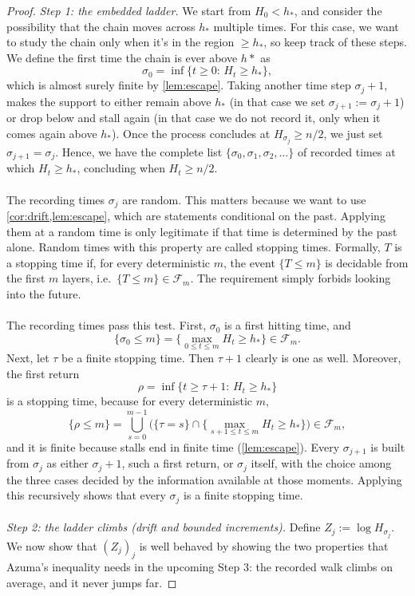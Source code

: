 \documentclass[
    aps,
    superscriptaddress,
    onecolumn,
    10pt,
    prx,
    nofootinbib
]{revtex4-2}
\theoremstyle{namedstatement}
\theoremstyle{plain}
\begin{document}
\begin{proof}
\emph{Step 1: the embedded ladder.}
We start from $H_0<h_*$, and consider the possibility that the chain moves across $h_*$ multiple times. For this case, we want to study the chain only when it's in the region $\geq h_*$, so keep track of these steps. We define the first time the chain is ever above $h*$ as
\begin{equation}
  \sigma_0=\inf\{t\ge0:\,H_t\ge h_\ast\},
\end{equation}
which is almost surely finite by \cref{lem:escape}. Taking another time step $\sigma_j+1$, makes the support to either remain above $h_*$ (in that case we set $\sigma_{j+1} := \sigma_j + 1$) or drop below and stall again (in that case we do not record it, only when it comes again above $h_*$). Once the process concludes at $H_{\sigma_j}\ge n/2$, we just set $\sigma_{j+1}=\sigma_j$.
Hence, we have the complete list $\{\sigma_0,\sigma_1,\sigma_2,\ldots\}$ of recorded times at which $H_t \geq h_*$, concluding when $H_t\geq n/2$.
\\
\\
The recording times $\sigma_j$ are random. This matters because we want to use \cref{cor:drift,lem:escape}, which are statements conditional on the past. Applying them at a random time is only legitimate if that time is determined by the past alone. Random times with this property are called stopping times. Formally, $T$ is a stopping time if, for every deterministic $m$, the event $\{T\le m\}$ is decidable from the first $m$ layers, i.e.\ $\{T\le m\}\in\mathcal F_m$. The requirement simply forbids looking into the future.
\\
\\
The recording times pass this test. First, $\sigma_0$ is a first hitting time, and
\begin{equation}
  \{\sigma_0\le m\}=\big\{\max_{0\le t\le m}H_t\ge h_\ast\big\}\in\mathcal F_m .
\end{equation}
Next, let $\tau$ be a finite stopping time. Then $\tau+1$ clearly is one as well. Moreover, the first return
\begin{equation}
  \rho=\inf\{t\ge\tau+1:\,H_t\ge h_\ast\}
\end{equation}
is a stopping time, because for every deterministic $m$,
\begin{equation}
  \{\rho\le m\}=\bigcup_{s=0}^{m-1}\Big(\{\tau=s\}\cap
  \big\{\max_{s+1\le t\le m}H_t\ge h_\ast\big\}\Big)\in\mathcal F_m ,
\end{equation}
and it is finite because stalls end in finite time (\cref{lem:escape}). Every
$\sigma_{j+1}$ is built from $\sigma_j$ as either $\sigma_j+1$, such a first return,
or $\sigma_j$ itself, with the choice among the three cases decided by
the information available at those moments. Applying this recursively shows that every
$\sigma_j$ is a finite stopping time.
\\
\\
\medskip\noindent\emph{Step 2: the ladder climbs (drift and bounded increments).}
Define $Z_j:=\log H_{\sigma_j}$. We now show that $(Z_j)_j$ is well behaved by showing the two properties that Azuma's inequality needs in the upcoming Step 3: the recorded walk climbs on average, and it never jumps far.


\end{proof}
\end{document}

